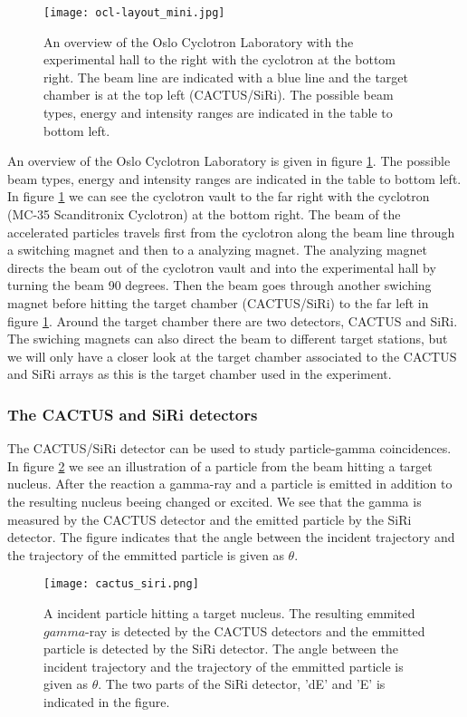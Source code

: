 \documentclass[11pt,a4wide]{article}
\begin{document}
\begin{figure}[htp]
\centering
\texttt{[image: ocl-layout\_mini.jpg]}
\caption{An overview of the Oslo Cyclotron Laboratory with the experimental hall to the right with the cyclotron at the bottom right. The beam line are indicated with a blue line and the target chamber is at the top left (CACTUS/SiRi). The possible beam types, energy and intensity ranges are indicated in the table to bottom left. }
\label{fig:OLC_exp_hall}
\end{figure}

An overview of the Oslo Cyclotron Laboratory is given in figure \ref{fig:OLC_exp_hall}. The possible beam types, energy and intensity ranges are indicated in the table to bottom left. In figure \ref{fig:OLC_exp_hall} we can see the cyclotron vault to the far right with the cyclotron (MC-35 Scanditronix Cyclotron) at the bottom right. The beam of the accelerated particles travels first from the cyclotron along the beam line through a switching magnet and then to a analyzing magnet. The analyzing magnet directs the beam out of the cyclotron vault and into the experimental hall by turning the beam 90 degrees. Then the beam goes through another swiching magnet before hitting the target chamber (CACTUS/SiRi) to the far left in figure \ref{fig:OLC_exp_hall}. Around the target chamber there are two detectors, CACTUS and SiRi. The swiching magnets can also direct the beam to different target stations, but we will only have a closer look at the target chamber associated to the CACTUS and SiRi arrays as this is the target chamber used in the experiment. 

\subsubsection{The CACTUS and SiRi detectors}
The CACTUS/SiRi detector can be used to study particle-gamma coincidences. In figure \ref{fig: cactus_siri} we see an illustration of a particle from the beam hitting a target nucleus. After the reaction a gamma-ray and a particle is emitted in addition to the resulting nucleus beeing changed or excited. We see that the gamma is measured by the CACTUS detector and the emitted particle by the SiRi detector. The figure indicates that the angle between the incident trajectory and the trajectory of the emmitted particle is given as $\theta$.
\begin{figure}[htp]
\centering
\texttt{[image: cactus\_siri.png]}
\caption{A incident particle hitting a target nucleus. The resulting emmited $gamma$-ray is detected by the CACTUS detectors and the emmitted particle is detected by the SiRi detector. The angle between the incident trajectory and the trajectory of the emmitted particle is given as $\theta$. The two parts of the SiRi detector, 'dE' and 'E' is indicated in the figure.}
\label{fig: cactus_siri}
\end{figure}
\end{document}
